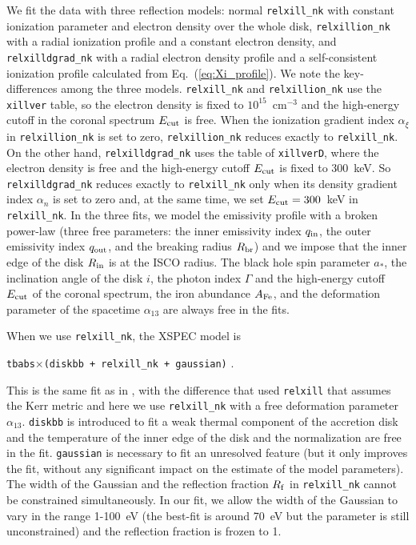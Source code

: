 \documentclass[twocolumn]{emulateapj}
\begin{document}
We fit the data with three reflection models: normal {\tt relxill\_nk} with constant ionization parameter and electron density over the whole disk, {\tt relxillion\_nk} with a radial ionization profile and a constant electron density, and {\tt relxilldgrad\_nk} with a radial electron density profile and a self-consistent ionization profile calculated from Eq.~(\ref{eq:Xi_profile}). We note the key-differences among the three models. {\tt relxill\_nk} and {\tt relxillion\_nk} use the {\tt xillver} table, so the electron density is fixed to $10^{15}$~cm$^{-3}$ and the high-energy cutoff in the coronal spectrum $E_{\rm cut}$ is free. When the ionization gradient index $\alpha_\xi$ in {\tt relxillion\_nk} is set to zero, {\tt relxillion\_nk} reduces exactly to {\tt relxill\_nk}. On the other hand, {\tt relxilldgrad\_nk} uses the table of {\tt xillverD}, where the electron density is free and the high-energy cutoff $E_{\rm cut}$ is fixed to 300~keV. So {\tt relxilldgrad\_nk} reduces exactly to {\tt relxill\_nk} only when its density gradient index $\alpha_n$ is set to zero and, at the same time, we set $E_{\rm cut} = 300$~keV in {\tt relxill\_nk}. In the three fits, we model the emissivity profile with a broken power-law (three free parameters: the inner emissivity index $q_{\rm in}$, the outer emissivity index $q_{\rm out}$, and the breaking radius $R_{\rm br}$) and we impose that the inner edge of the disk $R_{\rm in}$ is at the ISCO radius. The black hole spin parameter $a_*$, the inclination angle of the disk $i$, the photon index $\Gamma$ and the high-energy cutoff $E_{\rm cut}$ of the coronal spectrum, the iron abundance $A_{\rm Fe}$, and the deformation parameter of the spacetime $\alpha_{13}$ are always free in the fits.
 

When we use {\tt relxill\_nk}, the XSPEC model is

\vspace{0.2cm}

{\tt tbabs$\times$(diskbb + relxill\_nk + gaussian)} .

\vspace{0.2cm}

\noindent This is the same fit as in \citet{2020ApJ...900...78D}, with the difference that \citet{2020ApJ...900...78D} used {\tt relxill} that assumes the Kerr metric and here we use {\tt relxill\_nk} with a free deformation parameter $\alpha_{13}$. {\tt diskbb} is introduced to fit a weak thermal component of the accretion disk~\citep{1984PASJ...36..741M} and the temperature of the inner edge of the disk and the normalization are free in the fit.
{\tt gaussian} is necessary to fit an unresolved feature (but it only improves the fit, without any significant impact on the estimate of the model parameters). 
The width of the Gaussian and the reflection fraction $R_{\rm f}$ in {\tt relxill\_nk} cannot be constrained simultaneously. In our fit, we allow the width of the Gaussian to vary in the range 1-100~eV (the best-fit is around 70~eV but the parameter is still unconstrained) and the reflection fraction is frozen to 1.
\end{document}

